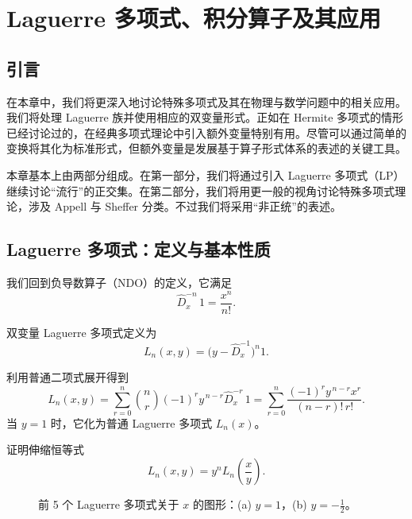 
\chapter{Laguerre 多项式、积分算子及其应用}

\section{引言}

在本章中，我们将更深入地讨论特殊多项式及其在物理与数学问题中的相关应用。我们将处理 Laguerre 族并使用相应的双变量形式。正如在 Hermite 多项式的情形已经讨论过的，在经典多项式理论中引入额外变量特别有用。尽管可以通过简单的变换将其化为标准形式，但额外变量是发展基于算子形式体系的表述的关键工具。

本章基本上由两部分组成。在第一部分，我们将通过引入 Laguerre 多项式（LP）继续讨论``流行''的正交集。在第二部分，我们将用更一般的视角讨论特殊多项式理论，涉及 Appell 与 Sheffer 分类。不过我们将采用``非正统''的表述。

\section{Laguerre 多项式：定义与基本性质}

我们回到负导数算子（NDO）的定义，它满足
\begin{equation}
\hat D_x^{-n}\,1 = \frac{x^n}{n!}.
\label{eq:4.1.1}
\end{equation}

双变量 Laguerre 多项式定义为
\begin{equation}
L_n(x,y) = \bigl(y - \hat D_x^{-1}\bigr)^n 1.
\label{eq:4.1.2}
\end{equation}

利用普通二项式展开得到
\begin{equation}
L_n(x,y) = \sum_{r=0}^{n} \binom{n}{r} (-1)^r y^{\,n-r} \hat D_x^{-r}\,1
= \sum_{r=0}^{n} \frac{(-1)^r y^{\,n-r} x^r}{(n-r)!\,r!}.
\label{eq:4.1.3}
\end{equation}
当 $y=1$ 时，它化为普通 Laguerre 多项式 $L_n(x)$。

\begin{exercise}
证明伸缩恒等式
\begin{equation}
L_n(x,y) = y^n L_n\!\left(\frac{x}{y}\right).
\label{eq:4.1.4}
\end{equation}
\end{exercise}

\begin{figure}[h]
\centering
\setlength{\fboxsep}{6pt}
\caption{前 5 个 Laguerre 多项式关于 $x$ 的图形：(a) $y=1$，(b) $y=-\tfrac12$。}
\label{fig:4.1}
\end{figure}

